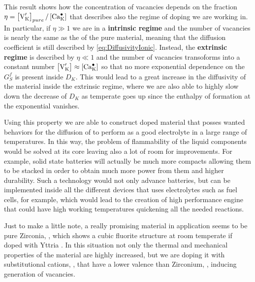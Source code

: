 This result shows how the concentration of vacancies depends on the fraction $\eta = \left[ \ce{V_K}^\prime \right]_{pure}/\left[ \ce{Ca_K}^\bullet \right]$ that describes also the regime of doping we are working in. In particular, if $\eta \gg 1$ we are in a \textbf{intrinsic regime} and the number of vacancies is nearly the same as the of the pure material, meaning that the diffusion coefficient is still described by \eqref{eq:DiffusivityIonic}. Instead, the \textbf{extrinsic regime} is described by $\eta \ll 1$ and the number of vacancies transoforms into a constant number $\left[ \ce{V_K}^\prime \right] \approx \left[ \ce{Ca_K}^\bullet \right]$ so that no more exponential dependence on the $G_S^f$ is present inside $D_K$. This would lead to a great increase in the diffusivity of the material inside the extrinsic regime, where we are also able to highly slow down the decrease of $D_K$ as temperate goes up since the enthalpy of formation at the exponential vanishes.

Using this property we are able to construct doped material that posses wanted behaviors for the diffusion of  to perform as a good electrolyte in a large range of temperatures. In this way, the problem of flammability of the liquid components would be solved at its core leaving also a lot of room for improvements. For example, solid state batteries will actually be much more compacts allowing them to be stacked in order to obtain much more power from them and higher durability. Such a technology would not only advance batteries, but can be implemented inside all the different devices that uses electrolytes such as fuel cells, for example, which would lead to the creation of high performance engine that could have high working temperatures quickening all the needed reactions.

\nt
{
    Just to make a little note, a really promising material in application seems to be pure Zirconia, , which shows a cubic fluorite structure at room temperate if doped with Yttria . In this situation not only the thermal and mechanical properties of the material are highly increased, but we are doping it with substitutional cations, , that have a lower valence than Zirconium, , inducing generation of vacancies.
}